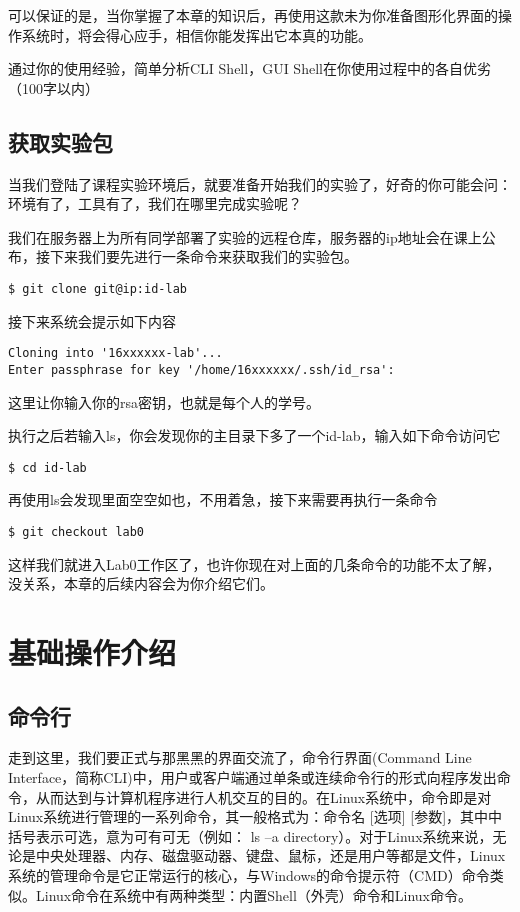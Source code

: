 可以保证的是，当你掌握了本章的知识后，再使用这款未为你准备图形化界面的操作系统时，将会得心应手，相信你能发挥出它本真的功能。

\begin{thinking}\label{think-Shell简析}
通过你的使用经验，简单分析CLI Shell，GUI Shell在你使用过程中的各自优劣（100字以内）
\end{thinking}

\subsection{获取实验包}

当我们登陆了课程实验环境后，就要准备开始我们的实验了，好奇的你可能会问：环境有了，工具有了，我们在哪里完成实验呢？

我们在服务器上为所有同学部署了实验的远程仓库，服务器的ip地址会在课上公布，接下来我们要先进行一条命令来获取我们的实验包。
\begin{verbatim}
$ git clone git@ip:id-lab
\end{verbatim}

接下来系统会提示如下内容
\begin{verbatim}
Cloning into '16xxxxxx-lab'...
Enter passphrase for key '/home/16xxxxxx/.ssh/id_rsa':
\end{verbatim}

这里让你输入你的rsa密钥，也就是每个人的学号。

执行之后若输入ls，你会发现你的主目录下多了一个id-lab，输入如下命令访问它
\begin{verbatim}
$ cd id-lab
\end{verbatim}

再使用ls会发现里面空空如也，不用着急，接下来需要再执行一条命令
\begin{verbatim}
$ git checkout lab0
\end{verbatim}

这样我们就进入Lab0工作区了，也许你现在对上面的几条命令的功能不太了解，没关系，本章的后续内容会为你介绍它们。

\section{基础操作介绍}
\subsection{命令行}
走到这里，我们要正式与那黑黑的界面交流了，命令行界面(Command Line Interface，简称CLI)中，用户或客户端通过单条或连续命令行的形式向程序发出命令，从而达到与计算机程序进行人机交互的目的。在Linux系统中，命令即是对Linux系统进行管理的一系列命令，其一般格式为：命令名 [选项] [参数]，其中中括号表示可选，意为可有可无（例如： ls –a directory）。对于Linux系统来说，无论是中央处理器、内存、磁盘驱动器、键盘、鼠标，还是用户等都是文件，Linux系统的管理命令是它正常运行的核心，与Windows的命令提示符（CMD）命令类似。Linux命令在系统中有两种类型：内置Shell（外壳）命令和Linux命令。

